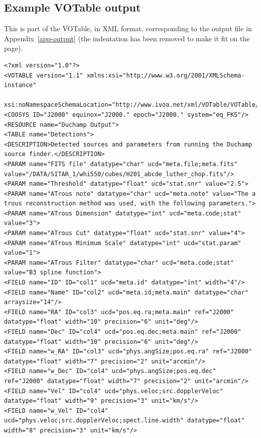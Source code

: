 \documentclass[12pt,a4paper]{article}
\begin{document}
\begin{landscape}

\newpage
\section{Example VOTable output}
\label{app-votable}
This is part of the VOTable, in XML format, corresponding to the
output file in Appendix~\ref{app-output} (the indentation has been
removed to make it fit on the page).

{\scriptsize
  \begin{verbatim}
<?xml version="1.0"?>
<VOTABLE version="1.1" xmlns:xsi="http://www.w3.org/2001/XMLSchema-instance"
 xsi:noNamespaceSchemaLocation="http://www.ivoa.net/xml/VOTable/VOTable/v1.1">
<COOSYS ID="J2000" equinox="J2000." epoch="J2000." system="eq_FK5"/>
<RESOURCE name="Duchamp Output">
<TABLE name="Detections">
<DESCRIPTION>Detected sources and parameters from running the Duchamp source finder.</DESCRIPTION>
<PARAM name="FITS file" datatype="char" ucd="meta.file;meta.fits" value="/DATA/SITAR_1/whi550/cubes/H201_abcde_luther_chop.fits"/>
<PARAM name="Threshold" datatype="float" ucd="stat.snr" value="2.5">
<PARAM name="ATrous note" datatype="char" ucd="meta.note" value="The a trous reconstruction method was used, with the following parameters.">
<PARAM name="ATrous Dimension" datatype="int" ucd="meta.code;stat" value="3">
<PARAM name="ATrous Cut" datatype="float" ucd="stat.snr" value="4">
<PARAM name="ATrous Minimum Scale" datatype="int" ucd="stat.param" value="1">
<PARAM name="ATrous Filter" datatype="char" ucd="meta.code;stat" value="B3 spline function">
<FIELD name="ID" ID="col1" ucd="meta.id" datatype="int" width="4"/>
<FIELD name="Name" ID="col2" ucd="meta.id;meta.main" datatype="char" arraysize="14"/>
<FIELD name="RA" ID="col3" ucd="pos.eq.ra;meta.main" ref="J2000" datatype="float" width="10" precision="6" unit="deg"/>
<FIELD name="Dec" ID="col4" ucd="pos.eq.dec;meta.main" ref="J2000" datatype="float" width="10" precision="6" unit="deg"/>
<FIELD name="w_RA" ID="col3" ucd="phys.angSize;pos.eq.ra" ref="J2000" datatype="float" width="7" precision="2" unit="arcmin"/>
<FIELD name="w_Dec" ID="col4" ucd="phys.angSize;pos.eq.dec" ref="J2000" datatype="float" width="7" precision="2" unit="arcmin"/>
<FIELD name="Vel" ID="col4" ucd="phys.veloc;src.dopplerVeloc" datatype="float" width="9" precision="3" unit="km/s"/>
<FIELD name="w_Vel" ID="col4" ucd="phys.veloc;src.dopplerVeloc;spect.line.width" datatype="float" width="8" precision="3" unit="km/s"/>

\end{verbatim}}
\end{landscape}
\end{document}
